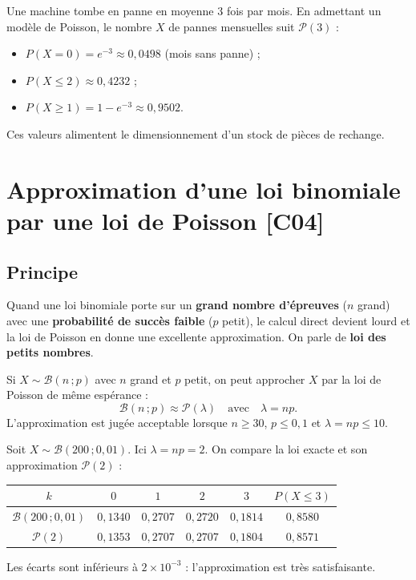 \documentclass[a4paper,11pt]{article}
\begin{document}
\begin{appliindus}
Une machine tombe en panne en moyenne $3$ fois par mois. En admettant un modèle de Poisson, le nombre $X$ de pannes mensuelles suit $\mathcal{P}(3)$ :
\begin{itemize}
  \item $P(X = 0) = e^{-3} \approx 0{,}0498$ (mois sans panne) ;
  \item $P(X \leq 2) \approx 0{,}4232$ ;
  \item $P(X \geq 1) = 1 - e^{-3} \approx 0{,}9502$.
\end{itemize}
Ces valeurs alimentent le dimensionnement d'un stock de pièces de rechange.
\end{appliindus}

\newpage
\section{Approximation d'une loi binomiale par une loi de Poisson \hfill {\normalsize\color{uimmred}[C04]}}

\subsection{Principe}

Quand une loi binomiale porte sur un \textbf{grand nombre d'épreuves} ($n$ grand) avec une \textbf{probabilité de succès faible} ($p$ petit), le calcul direct devient lourd et la loi de Poisson en donne une excellente approximation. On parle de \textbf{loi des petits nombres}.

\begin{theoreme}
Si $X \sim \mathcal{B}(n\,;p)$ avec $n$ grand et $p$ petit, on peut approcher $X$ par la loi de Poisson de même espérance :
\[
\mathcal{B}(n\,;p) \approx \mathcal{P}(\lambda) \quad\text{avec}\quad \lambda = np.
\]
L'approximation est jugée acceptable lorsque $n \geq 30$, $p \leq 0{,}1$ et $\lambda = np \leq 10$.
\end{theoreme}

\begin{exemple}
Soit $X \sim \mathcal{B}(200\,;0{,}01)$. Ici $\lambda = np = 2$. On compare la loi exacte et son approximation $\mathcal{P}(2)$ :
\begin{center}
\renewcommand{\arraystretch}{1.3}
\begin{tabular}{|c|c|c|c|c|c|}
\hline
\rowcolor{uimmlightblue}
$k$ & $0$ & $1$ & $2$ & $3$ & $P(X \leq 3)$ \\
\hline
$\mathcal{B}(200\,;0{,}01)$ & $0{,}1340$ & $0{,}2707$ & $0{,}2720$ & $0{,}1814$ & $0{,}8580$ \\
\hline
$\mathcal{P}(2)$ & $0{,}1353$ & $0{,}2707$ & $0{,}2707$ & $0{,}1804$ & $0{,}8571$ \\
\hline
\end{tabular}
\end{center}
Les écarts sont inférieurs à $2 \times 10^{-3}$ : l'approximation est très satisfaisante.
\end{exemple}
\end{document}
